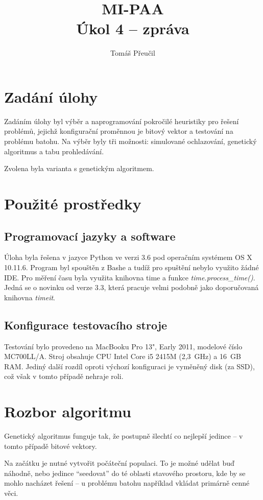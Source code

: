 \documentclass[a4paper]{article}
\title{MI-PAA\\
\large Úkol 4 -- zpráva\\}
\author{Tomáš Přeučil}
\begin{document}
\maketitle


\section{Zadání úlohy}
	Zadáním úlohy byl výběr a naprogramování pokročilé heuristiky pro řešení problémů, jejichž konfigurační proměnnou je bitový vektor a testování na problému batohu. Na výběr byly tři možnosti: simulované ochlazování, genetický algoritmus a tabu prohledávání.
	
	Zvolena byla varianta s genetickým algoritmem.


\section{Použité prostředky}
	\subsection{Programovací jazyky a software}
		Úloha byla řešena v jazyce Python ve verzi 3.6 pod operačním systémem OS X 10.11.6. Program byl spouštěn z Bashe a tudíž pro spuštění nebylo využito žádné IDE.
		Pro měření času byla využita knihovna time a funkce \textit{time.process\_time()}. Jedná se o novinku od verze 3.3, která pracuje velmi podobně jako doporučovaná knihovna \textit{timeit}.
		
	\subsection{Konfigurace testovacího stroje}
		Testování bylo provedeno na MacBooku Pro 13", Early 2011, modelové číslo MC700LL/A. Stroj obsahuje CPU Intel Core i5 2415M (2,3~GHz) a 16~GB RAM. Jediný další rozdíl oproti výchozí konfiguraci je vyměněný disk (za SSD), což však v tomto případě nehraje roli.

\section{Rozbor algoritmu}
	Genetický algoritmus funguje tak, že postupně šlechtí co nejlepší jedince -- v tomto případě bitové vektory.
	
	Na začátku je nutné vytvořit počáteční populaci. To je možné udělat buď náhodně, nebo jedince \enquote{seedovat} do té oblasti stavového prostoru, kde by se mohlo nacházet řešení -- u problému batohu například vkládat primárně cenné věci.
	
\end{document}
